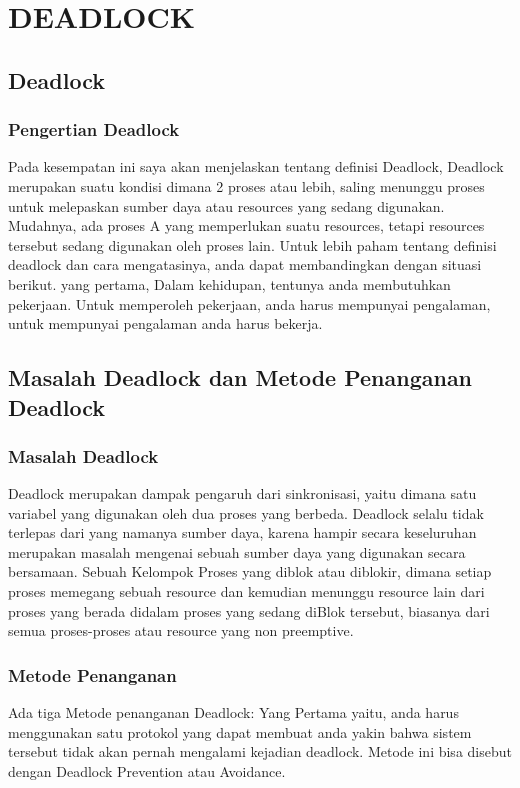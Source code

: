 
\section {DEADLOCK}

\subsection {Deadlock}
\subsubsection {Pengertian Deadlock}
	Pada kesempatan ini saya akan menjelaskan tentang definisi Deadlock, Deadlock merupakan suatu kondisi dimana 2 proses atau lebih, saling menunggu proses untuk melepaskan sumber daya atau resources yang sedang digunakan. Mudahnya, ada proses A yang memperlukan suatu resources, tetapi resources tersebut sedang digunakan oleh proses lain. Untuk lebih paham tentang definisi deadlock dan cara mengatasinya, anda dapat membandingkan dengan situasi berikut. yang pertama, Dalam kehidupan, tentunya anda membutuhkan pekerjaan. Untuk memperoleh pekerjaan, anda harus mempunyai pengalaman, untuk mempunyai pengalaman anda harus bekerja.
	
\subsection {Masalah Deadlock dan Metode Penanganan Deadlock}
\subsubsection {Masalah Deadlock}
	Deadlock merupakan dampak pengaruh dari sinkronisasi, yaitu dimana satu variabel yang digunakan oleh dua proses yang berbeda. Deadlock selalu tidak terlepas dari yang namanya sumber daya, karena hampir secara keseluruhan merupakan masalah mengenai sebuah sumber daya yang digunakan secara bersamaan. Sebuah Kelompok Proses yang diblok atau diblokir, dimana setiap proses memegang sebuah resource dan kemudian menunggu resource lain dari proses yang berada didalam proses yang sedang diBlok tersebut, biasanya dari semua proses-proses atau resource yang non preemptive.
	
\subsubsection {Metode Penanganan}
	Ada tiga Metode penanganan Deadlock:
	Yang Pertama yaitu, anda harus menggunakan satu protokol yang dapat membuat anda yakin bahwa sistem tersebut tidak akan pernah mengalami kejadian deadlock. Metode ini bisa disebut dengan Deadlock Prevention atau Avoidance.
	
